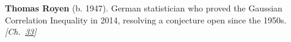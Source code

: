 \textbf{Thomas Royen} (b. 1947). German statistician who proved the Gaussian Correlation Inequality in 2014, resolving a conjecture open since the 1950s. \emph{[Ch.~\hyperref[ch:incubationinequality]{33}]}

